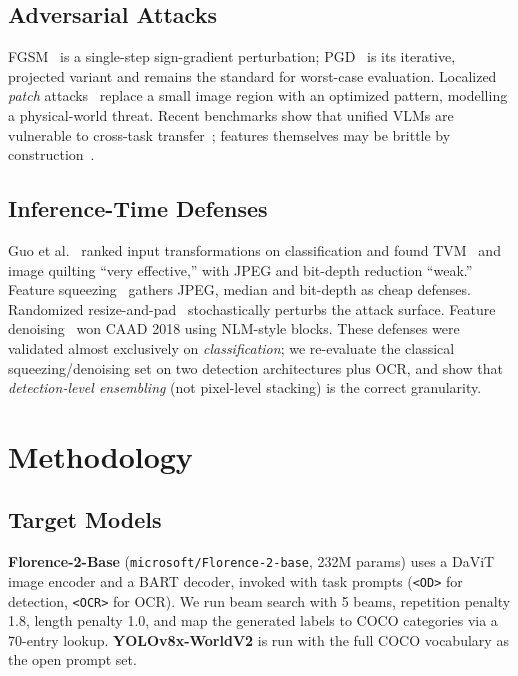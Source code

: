 \documentclass[10pt,twocolumn,letterpaper]{article}
\begin{document}
\subsection{Adversarial Attacks}
FGSM~\cite{goodfellow2014explaining} is a single-step sign-gradient perturbation; PGD~\cite{madry2017towards} is its iterative, projected variant and remains the standard for worst-case evaluation. Localized \emph{patch} attacks~\cite{brown2017adversarial} replace a small image region with an optimized pattern, modelling a physical-world threat. Recent benchmarks show that unified VLMs are vulnerable to cross-task transfer~\cite{wang2024oneobjectmultiplelies}; features themselves may be brittle by construction~\cite{ilyas2019adversarial}.

\subsection{Inference-Time Defenses}
Guo et al.~\cite{guo2018countering} ranked input transformations on classification and found TVM~\cite{chambolle2004tvm} and image quilting ``very effective,'' with JPEG and bit-depth reduction ``weak.'' Feature squeezing~\cite{xu2018feature} gathers JPEG, median and bit-depth as cheap defenses. Randomized resize-and-pad~\cite{xie2018mitigating} stochastically perturbs the attack surface. Feature denoising~\cite{xie2019feature} won CAAD 2018 using NLM-style blocks. These defenses were validated almost exclusively on \emph{classification}; we re-evaluate the classical squeezing/denoising set on two detection architectures plus OCR, and show that \emph{detection-level ensembling} (not pixel-level stacking) is the correct granularity.

\section{Methodology}

\subsection{Target Models}
\textbf{Florence-2-Base} (\texttt{microsoft/Florence-2-base}, 232M params) uses a DaViT image encoder and a BART decoder, invoked with task prompts (\texttt{<OD>} for detection, \texttt{<OCR>} for OCR). We run beam search with 5 beams, repetition penalty 1.8, length penalty 1.0, and map the generated labels to COCO categories via a 70-entry lookup. \textbf{YOLOv8x-WorldV2} is run with the full COCO vocabulary as the open prompt set.
\end{document}
